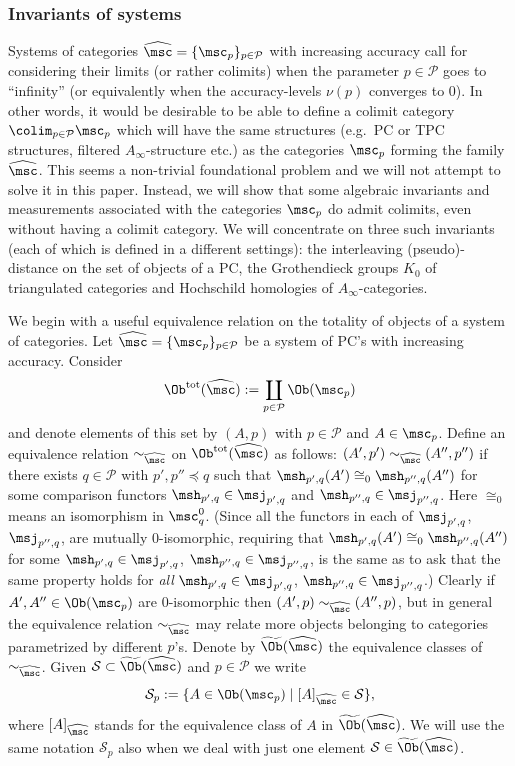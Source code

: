 \subsubsection{Invariants of systems} \label{sb:sys-inv} Systems of
categories $\widehat{\msc} = \{\msc_p\}_{p \in \mathcal{P}}$ with
increasing accuracy call for considering their limits (or rather
colimits) when the parameter $p \in \mathcal{P}$ goes to ``infinity''
(or equivalently when the accuracy-levels $\nu(p)$ converges to
$0$). In other words, it would be desirable to be able to define a
colimit category $\colim_{p \in \mathcal{P}} \msc_p$ which will have
the same structures (e.g.~PC or TPC structures, filtered
$A_{\infty}$-structure etc.) as the categories $\msc_p$ forming the
family $\widehat{\msc}$. This seems a non-trivial foundational problem
and we will not attempt to solve it in this paper. Instead, we will
show that some algebraic invariants and measurements associated with
the categories $\msc_p$ do admit colimits, even without having a
colimit category. We will concentrate on three such invariants (each
of which is defined in a different settings): the interleaving
(pseudo)-distance on the set of objects of a PC, the Grothendieck
groups $K_0$ of triangulated categories and Hochschild homologies of
$A_{\infty}$-categories.

We begin with a useful equivalence relation on the totality of
  objects of a system of categories.  \label{p:equiv-ob} Let
  $\widehat{\msc} = \{\msc_p\}_{p \in \mathcal{P}}$ be a system of
  PC's with increasing accuracy. Consider
  $$\Ob^{\text{tot}}(\widehat{\msc}) := \coprod_{p\in \mathcal{P}}
  \Ob(\msc_p)$$ and denote elements of this set by $(A,p)$ with
  $p \in \mathcal{P}$ and $A \in \msc_p$. Define an equivalence
  relation $\sim_{\widehat{\msc}}$ on
  $\Ob^{\text{tot}}(\widehat{\msc})$ as follows:
  $(A', p') \sim_{\widehat{\msc}} (A'', p'')$ if there exists
  $q \in \mathcal{P}$ with $p',p'' \preceq q$ such that
  $\msh_{p',q}(A') \cong_0 \msh_{p'',q}(A'')$ for some comparison
  functors $\msh_{p',q} \in \msj_{p',q}$ and
  $\msh_{p'',q} \in \msj_{p'',q}$. Here $\cong_0$ means an isomorphism
  in $\msc_q^0$. (Since all the functors in each of $\msj_{p',q}$,
  $\msj_{p'',q}$, are mutually $0$-isomorphic, requiring that
  $\msh_{p',q}(A') \cong_0 \msh_{p'',q}(A'')$ for some
  $\msh_{p',q} \in \msj_{p',q}$, $\msh_{p'',q} \in \msj_{p'',q}$, is
  the same as to ask that the same property holds for {\em all}
  $\msh_{p',q} \in \msj_{p',q}$, $\msh_{p'',q} \in \msj_{p'',q}$.)
  Clearly if $A', A'' \in \Ob(\msc_p)$ are $0$-isomorphic then
  $(A', p) \sim_{\widehat{\msc}} (A'',p)$, but in general the
  equivalence relation $\sim_{\widehat{\msc}}$ may relate more objects
  belonging to categories parametrized by different $p$'s.
Denote by $\widetilde{\Ob}(\widehat{\msc})$ the equivalence
  classes of $\sim_{\widehat{\msc}}$.  Given
  $\mathcal{S} \subset \widetilde{\Ob}(\widehat{\msc})$ and
  $p \in \mathcal{P}$ we write
$$\mathcal{S}_p := \{ A \in \Ob(\msc_p) \mid [A]_{\widehat{\msc}}
\in \mathcal{S}\},$$ where $[A]_{\widehat{\msc}}$ stands for the
equivalence class of $A$ in $\widetilde{\Ob}(\widehat{\msc})$.  We
will use the same notation $\mathcal{S}_p$ also when we deal with just
one element $\mathcal{S} \in \widetilde{\Ob}(\widehat{\msc})$.

